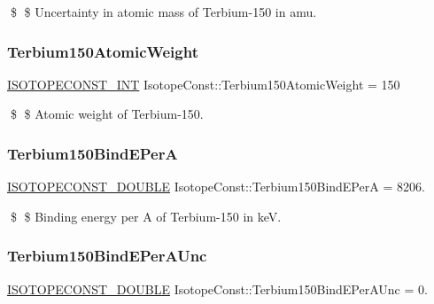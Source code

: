 \$ \$ Uncertainty in atomic mass of Terbium-\/150 in amu. \mbox{\label{group___isotope_const-_terbium-_tb150_gaa0c2493139cb90bc8123aecf267ed739}} 
\subsubsection{\texorpdfstring{Terbium150\+Atomic\+Weight}{Terbium150AtomicWeight}}
{\footnotesize\ttfamily \mbox{\hyperlink{group___isotope_const-_macros_ga5f18360b3e99483a35c32d789e62621c}{I\+S\+O\+T\+O\+P\+E\+C\+O\+N\+S\+T\+\_\+\+I\+NT}} Isotope\+Const\+::\+Terbium150\+Atomic\+Weight = 150}

\$ \$ Atomic weight of Terbium-\/150. \mbox{\label{group___isotope_const-_terbium-_tb150_gae32ade9089f8ba1e8957aecbdb503963}} 
\subsubsection{\texorpdfstring{Terbium150\+Bind\+E\+PerA}{Terbium150BindEPerA}}
{\footnotesize\ttfamily \mbox{\hyperlink{group___isotope_const-_macros_ga8f45a7272ce02c0b4c65c44636ed719a}{I\+S\+O\+T\+O\+P\+E\+C\+O\+N\+S\+T\+\_\+\+D\+O\+U\+B\+LE}} Isotope\+Const\+::\+Terbium150\+Bind\+E\+PerA = 8206.}

\$ \$ Binding energy per A of Terbium-\/150 in keV. \mbox{\label{group___isotope_const-_terbium-_tb150_ga622924ea898ffde5f0eabc18418411b0}} 
\subsubsection{\texorpdfstring{Terbium150\+Bind\+E\+Per\+A\+Unc}{Terbium150BindEPerAUnc}}
{\footnotesize\ttfamily \mbox{\hyperlink{group___isotope_const-_macros_ga8f45a7272ce02c0b4c65c44636ed719a}{I\+S\+O\+T\+O\+P\+E\+C\+O\+N\+S\+T\+\_\+\+D\+O\+U\+B\+LE}} Isotope\+Const\+::\+Terbium150\+Bind\+E\+Per\+A\+Unc = 0.}

